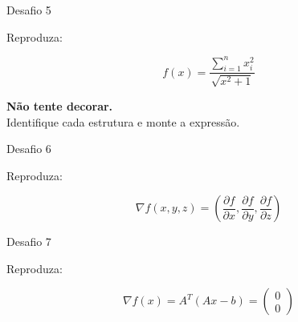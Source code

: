 \documentclass[aspectratio=169,xcolor=dvipsnames]{beamer}
\begin{document}
\begin{frame}{Desafio 5}

    Reproduza:

    \[
        f(x)=
        \frac{
            \displaystyle\sum_{i=1}^{n}x_i^2
        }{
            \sqrt{x^2+1}
        }
    \]

    \vspace{0.3cm}

    \begin{center}
        \textbf{Não tente decorar.}\\
        Identifique cada estrutura e monte a expressão.
    \end{center}

\end{frame}

\begin{frame}{Desafio 6}

    Reproduza:

    \[
        \nabla f(x,y,z) = \left( \frac{\partial f}{\partial x}, \frac{\partial f}{\partial y}, \frac{\partial f}{\partial z} \right)
    \]

    \vspace{0.3cm}


\end{frame}

\begin{frame}{Desafio 7}

    Reproduza:

    \[
        \nabla f(x) = A^T(Ax - b) =
        \begin{pmatrix}
            0 \\
            0
        \end{pmatrix}
    \]

    \vspace{0.3cm}


\end{frame}
\end{document}
